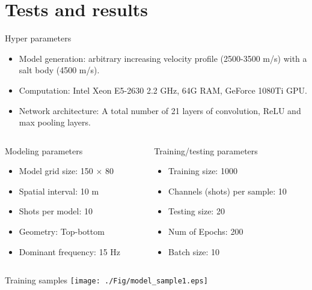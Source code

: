 \documentclass[aspectratio=169]{beamer}
\begin{document}
\section{Tests and results}
\begin{frame}{Hyper parameters}

\begin{itemize}
\item{Model generation: arbitrary increasing velocity profile (2500-3500 m/s) with a salt body (4500 m/s).}
\item{Computation: Intel Xeon E5-2630 2.2 GHz, 64G RAM, GeForce 1080Ti GPU.}
\item{Network architecture: A total number of 21 layers of convolution, ReLU and max pooling layers.}
\end{itemize}

\begin{columns}
  \begin{column}{0.50\textwidth}
  \begin{block}{Modeling parameters}
    \begin{itemize}
    \item{Model grid size: 150 $\times$ 80}
    \item{Spatial interval: 10 m}
    \item{Shots per model: 10}
    \item{Geometry: Top-bottom}
    \item{Dominant frequency: 15 Hz}
    \end{itemize}
  \end{block}
  \end{column}
  \begin{column}{0.50\textwidth}
  \begin{block}{Training/testing parameters}
    \begin{itemize}
    \item{Training size: 1000}
    \item{Channels (shots) per sample: 10}
    \item{Testing size: 20}
    \item{Num of Epochs: 200}
    \item{Batch size: 10}
    \end{itemize}
  \end{block}
  \end{column}
\end{columns}
\end{frame}
\begin{frame}{Training samples}
    \texttt{[image: ./Fig/model\_sample1.eps]}
\end{frame}
\end{document}
